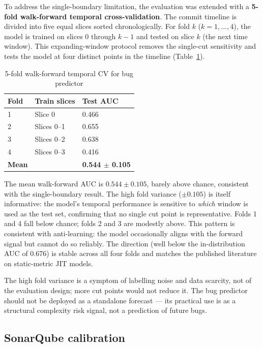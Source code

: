 \documentclass[12pt, oneside]{report}
\begin{document}
To address the single-boundary limitation, the evaluation was extended with a
\textbf{5-fold walk-forward temporal cross-validation}. The commit timeline is divided
into five equal slices sorted chronologically. For fold $k$ ($k = 1, \ldots, 4$),
the model is trained on slices $0$ through $k-1$ and tested on slice $k$ (the next
time window). This expanding-window protocol removes the single-cut sensitivity and
tests the model at four distinct points in the timeline (Table~\ref{tab:walkforward}).

\begin{table}[H]
\centering
\caption{5-fold walk-forward temporal CV for bug predictor}
\label{tab:walkforward}
\begin{tabular}{@{}lll@{}}
\toprule
\textbf{Fold} & \textbf{Train slices} & \textbf{Test AUC} \\
\midrule
1 & Slice 0       & 0.466 \\
2 & Slices 0--1   & 0.655 \\
3 & Slices 0--2   & 0.638 \\
4 & Slices 0--3   & 0.416 \\
\midrule
\textbf{Mean} & & \textbf{0.544 $\pm$ 0.105} \\
\bottomrule
\end{tabular}
\end{table}

The mean walk-forward AUC is $0.544 \pm 0.105$, barely above chance, consistent with
the single-boundary result. The high fold variance ($\pm 0.105$) is itself informative:
the model's temporal performance is sensitive to \textit{which} window is used as the
test set, confirming that no single cut point is representative. Folds 1 and 4 fall
below chance; folds 2 and 3 are modestly above. This pattern is consistent with
anti-learning: the model occasionally aligns with the forward signal but cannot do so
reliably. The direction (well below the in-distribution AUC of 0.676) is stable across all four folds and matches the published literature on static-metric JIT models.

The high fold variance is a symptom of labelling noise and data scarcity, not of the evaluation design; more cut points would not reduce it. The bug predictor should not be deployed as a standalone forecast — its practical use is as a structural complexity risk signal, not a prediction of future bugs.

\subsection{SonarQube calibration}
\end{document}
